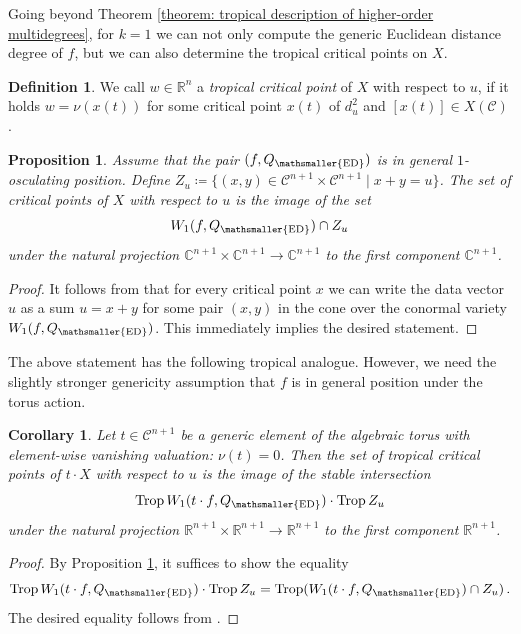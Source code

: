 \documentclass[11pt,reqno]{amsart}
\numberwithin{equation}{section}
\theoremstyle{plain}
\numberwithin{theorem}{section}
\newtheorem{proposition}[theorem]{Proposition}
\newtheorem{corollary}[theorem]{Corollary}
\theoremstyle{definition}
\newtheorem{definition}[theorem]{Definition}
\newcommand{\R}{\mathbb{R}}
\newcommand{\C}{\mathbb{C}}
\newcommand{\CC}{\mathcal{C}}
\DeclareMathOperator{\Trop}{Trop}
\newcommand{\mED}{\mathsmaller{\mathrm{ED}}}
\begin{document}
Going beyond Theorem \ref{theorem: tropical description of higher-order multidegrees}, for $k=1$ we can not only compute the generic Euclidean distance degree of $f$, but we can also determine the tropical critical points on $X$.

\begin{definition}
We call $w \in \R^n$ a {\em tropical critical point} of $X$ with respect to $u$, if it holds $w = \nu(x(t))$ for some critical point $x(t)$ of $d_u^2$ and $[x(t)] \in X(\CC)$.
\end{definition}



\begin{proposition}\label{prop: critical points w.r.t. u.}
Assume that the pair $(f,Q_\mED)$ is in general $1$-osculating position. Define $Z_u \coloneqq\{(x,y) \in \CC^{n+1} \times \CC^{n+1} \mid x+y = u\}$. The set of critical points of $X$ with respect to $u$ is the image of the set
\[
W_1(f,Q_\mED) \cap Z_u
\]
under the natural projection $\C^{n+1} \times \C^{n+1} \to \C^{n+1}$ to the first component $\C^{n+1}$.
\end{proposition}
\begin{proof}
It follows from \cite[Lemma 2.8]{DHOST} that for every critical point $x$ we can write the data vector $u$ as a sum $u = x + y$ for some pair $(x,y) $ in the cone over the conormal variety $W_1(f,Q_\mED)$.
This immediately implies the desired statement.
\end{proof}

The above statement has the following tropical analogue. However, we need the slightly stronger genericity assumption that $f$ is in general position under the torus action.
\begin{corollary}\label{corollary: tropical critical points from the tropical conormal variety}
Let $t \in \CC^{n+1}$ be a generic element of the algebraic torus with element-wise vanishing valuation: $\nu(t) = 0$. Then the set of tropical critical points of $t \cdot X$ with respect to $u$ is the image of the stable intersection
\[
\Trop W_1(t\cdot f,Q_\mED) \cdot \Trop Z_u
\]
under the natural projection $\R^{n+1}\times\R^{n+1}\to\R^{n+1}$ to the first component $\R^{n+1}$.
\end{corollary}
\begin{proof}
By Proposition \ref{prop: critical points w.r.t. u.}, it suffices to show the equality
\[
\Trop W_1(t \cdot f,Q_\mED) \cdot \Trop Z_u = \Trop(W_1( t \cdot f,Q_\mED) \cap Z_u)\,.
\]
The desired equality follows from \cite[Theorem 5.3.3]{osserman2013lifting}.
\end{proof}
\end{document}
